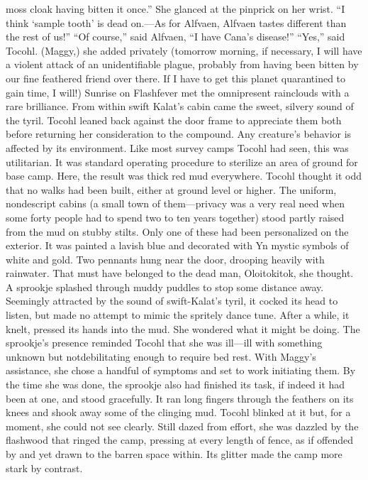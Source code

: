 \documentclass[9pt]{article}
\begin{document}
moss cloak having bitten it once.”
She glanced at the pinprick on her wrist. “I think ‘sample tooth’ is dead on.—As for Alfvaen,
Alfvaen tastes different than the rest of us!”
“Of course,” said Alfvaen, “I have Cana’s disease!”
“Yes,” said Tocohl. (Maggy,) she added privately (tomorrow morning, if necessary, I will have a
violent attack of an unidentifiable plague, probably from having been bitten by our fine feathered friend
over there. If I have to get this planet quarantined to gain time, I will!)
Sunrise on Flashfever met the omnipresent rainclouds with a rare brilliance. From within swift Kalat’s
cabin came the sweet, silvery sound of the tyril. Tocohl leaned back against the door frame to appreciate
them both before returning her consideration to the compound.
Any creature’s behavior is affected by its environment. Like most survey camps Tocohl had seen,
this was utilitarian. It was standard operating procedure to sterilize an area of ground for base camp.
Here, the result was thick red mud everywhere. Tocohl thought it odd that no walks had been built, either
at ground level or higher. The uniform, nondescript cabins (a small town of them—privacy was a very
real need when some forty people had to spend two to ten years together) stood partly raised from the
mud on stubby stilts.
Only one of these had been personalized on the exterior. It was painted a lavish blue and decorated
with Yn mystic symbols of white and gold. Two pennants hung near the door, drooping heavily with
rainwater. That must have belonged to the dead man, Oloitokitok, she thought.
A sprookje splashed through muddy puddles to stop some distance away. Seemingly attracted by
the sound of swift-Kalat’s tyril, it cocked its head to listen, but made no attempt to mimic the spritely
dance tune. After a while, it knelt, pressed its hands into the mud. She wondered what it might be doing.
The sprookje’s presence reminded Tocohl that she was ill—ill with something unknown but notdebilitating enough to require bed rest. With Maggy’s assistance, she chose a handful of symptoms and
set to work initiating them.
By the time she was done, the sprookje also had finished its task, if indeed it had been at one, and
stood gracefully. It ran long fingers through the feathers on its knees and shook away some of the clinging
mud. Tocohl blinked at it but, for a moment, she could not see clearly.
Still dazed from effort, she was dazzled by the flashwood that ringed the camp, pressing at every
length of fence, as if offended by and yet drawn to the barren space within. Its glitter made the camp
more stark by contrast.
\end{document}
